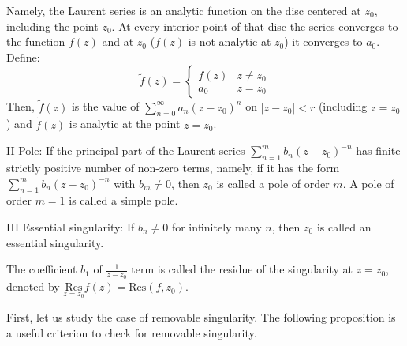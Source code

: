 Namely, the Laurent series is an analytic function on the disc centered at $z_0$, including the point $z_0$. At every interior point of that disc the series converges to the function $f(z)$ and at $z_0$
($f(z)$ is not analytic at $z_0$) it converges to $a_0$. Define:
\[
 \tilde{f}(z) = \begin{cases}
f(z) & z \neq z_0 \\
a_0 & z = z_0
\end{cases}
\]
Then, $\tilde{f}(z)$ is the value of $\sum_{n=0}^{\infty} a_n (z - z_0)^n$ on $|z - z_0| < r$ (including $z = z_0$) and $\tilde{f}(z)$ is analytic at the point $z = z_0$.

II Pole: If the principal part of the Laurent series $\sum_{n=1}^{m} b_n (z - z_0)^{-n}$ has finite strictly positive number of non-zero terms, namely, 
if it has the form $\sum_{n=1}^{m} b_n (z - z_0)^{-n}$ with $b_m \neq 0$, then $z_0$ is called a pole of order $m$. A pole of order $m = 1$ is called a simple pole.

III Essential singularity: If $b_n \neq 0$ for infinitely many $n$, then $z_0$ is called an essential singularity.

\begin{definition}\label{definition:16.2}
     The coefficient $b_1$ of $\frac{1}{z - z_0}$ term is called the residue of the singularity at $z = z_0$, denoted by $\underset{z=z_0}{\text{Res}} f(z) = \text{Res}(f, z_0)$.
\end{definition}

First, let us study the case of removable singularity. The following proposition is a useful criterion to check for removable singularity.

